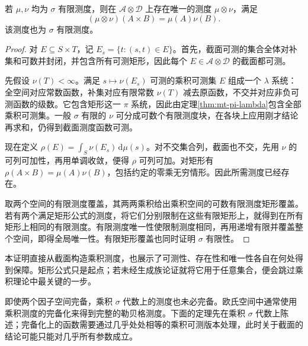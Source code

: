 \documentclass[UTF8,12pt,a4paper,fontset=fandol]{ctexbook}
\begin{document}
\begin{theorem}[乘积测度的存在唯一性]
若 $\mu,\nu$ 均为 $\sigma$ 有限测度，则在 $\mathcal A\otimes\mathcal D$ 上存在唯一的测度 $\mu\otimes\nu$，满足
\[
 (\mu\otimes\nu)(A\times B)=\mu(A)\nu(B).
\]
该测度也为 $\sigma$ 有限测度。
\label{thm:mt-product-measure}
\end{theorem}
\begin{proof}
对 $E\subseteq S\times T$，记 $E_s=\{t:(s,t)\in E\}$。首先，截面可测的集合全体对补集和可数并封闭，并包含所有可测矩形，因此每个 $E\in\mathcal A\otimes\mathcal D$ 的截面都可测。

先假设 $\nu(T)<\infty$。满足 $s\mapsto\nu(E_s)$ 可测的乘积可测集 $E$ 组成一个 $\lambda$ 系统：全空间对应常数函数，补集对应有限常数 $\nu(T)$ 减去原函数，不交并对应非负可测函数的级数。它包含矩形这一 $\pi$ 系统，因此由定理\ref{thm:mt-pi-lambda}包含全部乘积可测集。一般 $\sigma$ 有限的 $\nu$ 可分成可数个有限测度块，在各块上应用刚才结论再求和，仍得到截面测度函数可测。

现在定义 $\rho(E)=\int_S\nu(E_s)\,\mathrm d\mu(s)$。对不交集合列，截面也不交，先用 $\nu$ 的可列可加性，再用单调收敛，便得 $\rho$ 可列可加。对矩形有 $\rho(A\times B)=\mu(A)\nu(B)$，包括约定的零乘无穷情形。因此所需测度已经存在。

取两个空间的有限测度覆盖，其两两乘积给出乘积空间的可数有限测度矩形覆盖。若有两个满足矩形公式的测度，将它们分别限制在这些有限矩形上，就得到在所有矩形上相同的有限测度。有限测度唯一性使限制测度相同，再用递增有限并覆盖整个空间，即得全局唯一性。有限矩形覆盖也同时证明 $\sigma$ 有限性。
\end{proof}
本证明直接从截面构造乘积测度，也展示了可测性、存在性和唯一性各自在何处得到保障。矩形公式只是起点；若未经生成族论证就将它用于任意集合，便会跳过乘积理论中最关键的一步。

即使两个因子空间完备，乘积 $\sigma$ 代数上的测度也未必完备。欧氏空间中通常使用乘积测度的完备化来得到完整的勒贝格测度。下面的定理先在乘积 $\sigma$ 代数上陈述；完备化上的函数需要通过几乎处处相等的乘积可测版本处理，此时关于截面的结论可能只能对几乎所有参数成立。
\end{document}
